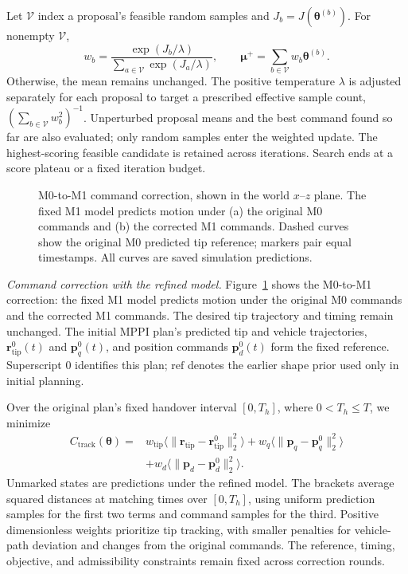 Let $\mathcal V$ index a proposal's feasible random samples and
$J_b=J(\boldsymbol\theta^{(b)})$. For nonempty $\mathcal V$,
\begin{equation}
w_b=\frac{\exp(J_b/\lambda)}{\sum_{a\in\mathcal V}\exp(J_a/\lambda)},
\qquad
\boldsymbol\mu^+=\sum_{b\in\mathcal V}w_b\boldsymbol\theta^{(b)}.
\label{eq:offline_sampling_update}
\end{equation}
Otherwise, the mean remains unchanged. The positive temperature
$\lambda$ is adjusted separately for each proposal to target a
prescribed effective sample count,
$(\sum_{b\in\mathcal V}w_b^2)^{-1}$.
Unperturbed proposal means and the best command found so far
are also evaluated; only random samples enter the weighted update.
The highest-scoring feasible candidate is retained across iterations.
Search ends at a score plateau or a fixed iteration budget.

\begin{figure}[t]
    \centering
    \resizebox{\columnwidth}{!}{}
    \caption{M0-to-M1 command correction, shown in the world $x$--$z$
    plane. The fixed M1 model predicts motion under (a) the original
    M0 commands and (b) the corrected M1 commands. Dashed curves show
    the original M0 predicted tip reference; markers pair equal
    timestamps. All curves are saved simulation predictions.}
    \label{fig:command_correction}
\end{figure}

\noindent\emph{Command correction with the refined model.}
Figure~\ref{fig:command_correction} shows the M0-to-M1 correction:
the fixed M1 model predicts motion under the original M0 commands
and the corrected M1 commands.
The desired tip trajectory and timing remain unchanged. The initial MPPI
plan's predicted tip and vehicle trajectories,
$\mathbf r_{\mathrm{tip}}^0(t)$ and $\mathbf p_q^0(t)$,
and position commands $\mathbf p_d^0(t)$ form the fixed reference.
Superscript $0$ identifies this plan; $\mathrm{ref}$ denotes
the earlier shape prior used only in initial planning.

Over the original plan's fixed handover interval $[0,T_h]$,
where $0<T_h\leq T$, we minimize
\begin{equation}
\begin{aligned}
C_{\mathrm{track}}(\boldsymbol\theta)
={}&w_{\mathrm{tip}}\bigl\langle\|\mathbf r_{\mathrm{tip}}-\mathbf r_{\mathrm{tip}}^0\|_2^2\bigr\rangle
+w_q\bigl\langle\|\mathbf p_q-\mathbf p_q^0\|_2^2\bigr\rangle\\
&+w_d\bigl\langle\|\mathbf p_d-\mathbf p_d^0\|_2^2\bigr\rangle.
\end{aligned}
\label{eq:reference_tracking_cost}
\end{equation}
Unmarked states are predictions under the refined model.
The brackets average squared distances at matching times over
$[0,T_h]$, using uniform prediction samples for the first two
terms and command samples for the third. Positive dimensionless
weights prioritize tip tracking, with smaller penalties for
vehicle-path deviation and changes from the original commands.
The reference, timing, objective, and admissibility constraints
remain fixed across correction rounds.

